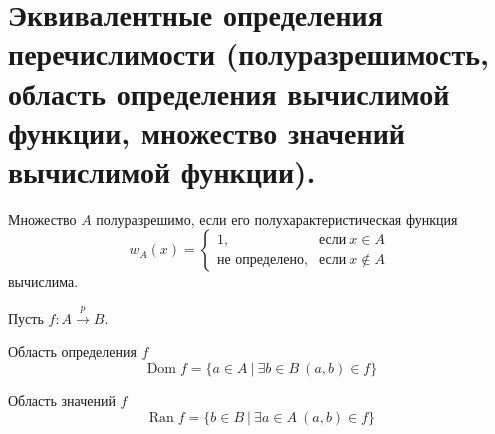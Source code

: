 \section{Эквивалентные определения перечислимости (полуразрешимость, область определения вычислимой функции, множество значений вычислимой функции).}

\begin{definition}
  Множество $A$ полуразрешимо, если его полухарактеристическая функция
  \[
    w_A(x) = \begin{cases}
      1, & \textit{если} \> x \in A \\
      \textit{не определено}, & \textit{если} \> x \notin A
    \end{cases}
  \]
  вычислима.
\end{definition}

Пусть $f : A \overset{p}{\to} B$.

\begin{definition}
  Область определения $f$
  \[
    \operatorname{Dom} f = \{a \in A \> | \> \exists b \in B \> (a,b) \in f\}
  \]
\end{definition}

\begin{definition}
  Область значений $f$
  \[
    \operatorname{Ran} f = \{b \in B \> | \> \exists a \in A \> (a,b) \in f\} 
  \]
\end{definition}

